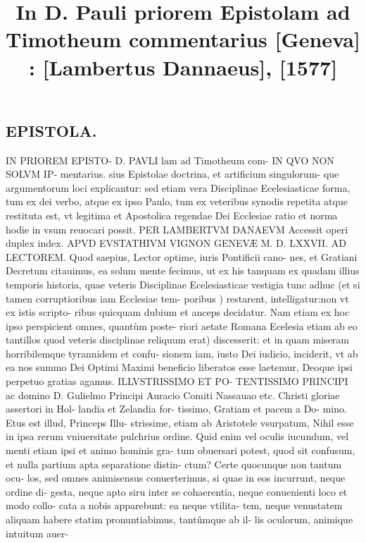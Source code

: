 \documentclass{article}
\begin{document}
\date{}
        \title{In D. Pauli priorem Epistolam ad Timotheum commentarius [Geneva] : [Lambertus Dannaeus], [1577]}
\maketitle
\tableofcontents
\clearpage
\begin{pages} 
\beginnumbering
\section{EPISTOLA. }     
\marginpar{[ p. ]}IN PRIOREM EPISTO- D.  PAVLI lam ad Timotheum com- IN QVO NON SOLVM IP- mentarius. sius Epistolae doctrina, et artificium singulorum- que argumentorum loci explicantur: sed etiam vera Disciplinae Ecelesiasticae forma, tum ex dei verbo, atque ex ipso Paulo, tum ex veteribus synodis repetita atque restituta est, vt legitima et Apostolica regendae Dei Ecclesiae ratio et norma hodie in vsum reuocari possit. PER LAMBERTVM DANAEVM Accessit operi duplex index. APVD EVSTATHIVM VIGNON GENEVÆ M. D. LXXVII. \pstart AD LECTOREM. Quod saepius, Lector optime, iuris Pontificii cano- nes, et Gratiani Decretum citauimus, ea solum mente fecimus, ut ex his tanquam ex quadam illius temporis historia, quae veteris Disciplinae Ecelesiasticae vestigia tunc adhuc (et si tamen corruptioribus iam Ecclesiae tem- poribus ) restarent, intelligatur:non vt ex istis scripto- ribus quicquam dubium et anceps decidatur. Nam etiam ex hoc ipso perspicient omnes, quantùm poste- riori aetate Romana Ecelesia etiam ab eo tantillos quod veteris disciplinae reliquum erat) discesserit: et in quam miseram horribilemque tyrannidem et confu- sionem iam, iusto Dei iudicio, inciderit, vt ab ea nos summo Dei Optimi Maximi beneficio liberatos esse laetemur, Deoque ipsi perpetuo gratias agamus.  \pend\pstart ILLVSTRISSIMO ET PO- TENTISSIMO PRINCIPI ac domino D. Gulielmo Principi Auracio Comiti Nassauao etc.  Christi gloriae assertori in Hol- landia et Zelandia for- tissimo, Gratiam et pacem a Do- mino.  \pend\pstart Etus est illud, Princeps Illu- strissime, etiam ab Aristotele vsurpatum, Nihil esse in ipsa rerum vniuersitate pulchrius ordine. Quid enim vel oculis iucundum, vel menti etiam ipsi et animo hominis gra- tum obuersari potest, quod sit confusum, et nulla partium apta separatione distin- ctum? Certe quocunque non tantum ocu- los, sed omnes animisensus conuerterimus, si quae in eos incurrunt, neque ordine di- gesta, neque apto siru inter se cohaerentia, neque conuenienti loco et modo collo- cata a nobis apparebunt: ea neque vtilita- tem, neque venustatem aliquam habere statim pronuntiabimus, tantûmque ab il- lis oculorum, animique intuitum auer-  \pend
\textbf{}

\end{pages}
\end{document}
